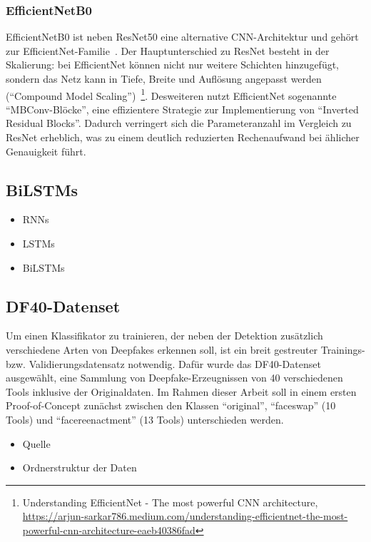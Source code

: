\documentclass{article}
\begin{document}
    \subsubsection{EfficientNetB0}
    EfficientNetB0 ist neben ResNet50 eine alternative CNN-Architektur und gehört zur EfficientNet-Familie~\cite{efficientnet}.
    Der Hauptunterschied zu ResNet besteht in der Skalierung: bei EfficientNet können nicht nur weitere Schichten hinzugefügt, sondern das Netz kann in Tiefe, Breite und Auflösung angepasst werden (\enquote{Compound Model Scaling})~\footnote{Understanding EfficientNet - The most powerful CNN architecture, \url{https://arjun-sarkar786.medium.com/understanding-efficientnet-the-most-powerful-cnn-architecture-eaeb40386fad}}.
    Desweiteren nutzt EfficientNet sogenannte \enquote{MBConv-Blöcke}, eine effizientere Strategie zur Implementierung von \enquote{Inverted Residual Blocks}.
    Dadurch verringert sich die Parameteranzahl im Vergleich zu ResNet erheblich, was zu einem deutlich reduzierten Rechenaufwand bei ählicher Genauigkeit führt.
    \subsection{BiLSTMs}
    \begin{itemize}
        \item RNNs
        \item LSTMs
        \item BiLSTMs %
    \end{itemize}
    \subsection{DF40-Datenset}
    Um einen Klassifikator zu trainieren, der neben der Detektion zusätzlich verschiedene Arten von Deepfakes erkennen soll, ist ein breit gestreuter Trainings- bzw. Validierungsdatensatz notwendig.
    Dafür wurde das DF40-Datenset~\cite{yan2024df40} ausgewählt, eine Sammlung von Deepfake-Erzeugnissen von 40 verschiedenen Tools inklusive der Originaldaten.
    Im Rahmen dieser Arbeit soll in einem ersten Proof-of-Concept zunächst zwischen den Klassen \enquote{original}, \enquote{faceswap} (10 Tools) und \enquote{facereenactment} (13 Tools) unterschieden werden.

    \begin{itemize}
        \item Quelle
        \item Ordnerstruktur der Daten
    \end{itemize}
\end{document}
